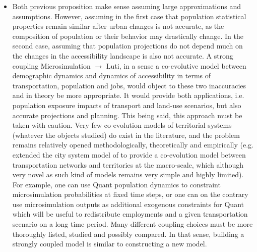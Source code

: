 \begin{itemize}
	\item Both previous proposition make sense assuming large approximations and assumptions. However, assuming in the first case that population statistical properties remain similar after urban changes is not accurate, as the composition of population or their behavior may drastically change. In the second case, assuming that population projections do not depend much on the changes in the accessibility landscape is also not accurate. A strong coupling Microsimulation $\rightarrow$ Luti, in a sense a co-evolutive model between  demographic dynamics and dynamics of accessibility in terms of transportation, population and jobs, would object to these two inaccuracies and in theory be more appropriate. It would provide both applications, i.e. population exposure impacts of transport and land-use scenarios, but also accurate projections and planning. This being said, this approach must be taken with caution. Very few co-evolution models of territorial systems (whatever the objects studied) do exist in the literature, and the problem remains relatively opened methodologically, theoretically and empirically (e.g. \cite{raimbault2018modeling} extended the city system model of \cite{raimbault2018indirect} to provide a co-evolution model between transportation networks and territories at the macro-scale, which although very novel as such kind of models remains very simple and highly limited). For example, one can use Quant population dynamics to constraint microsimulation probabilities at fixed time steps, or one can on the contrary use microsimulation outputs as additional exogenous constraints for Quant which will be useful to redistribute employments and a given transportation scenario on a long time period. Many different coupling choices must be more thoroughly listed, studied and possibly compared. In that sense, building a strongly coupled model is similar to constructing a new model.
\end{itemize}













